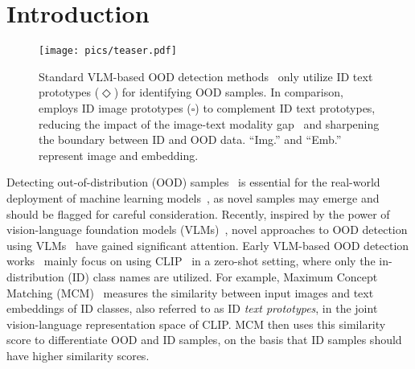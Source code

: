 \section{Introduction}
\label{sec:intro}

\begin{figure}
    \centering
    \texttt{[image: pics/teaser.pdf]}
    \vspace{-0.7em}
    \caption{
    Standard VLM-based OOD detection methods~\cite{ming2022delving,miyai_locoop_2023,li_learning_2024} only utilize ID text prototypes ($\Diamond$) for identifying OOD samples. 
    In comparison, \ours employs ID image prototypes ($\square$) to complement ID text prototypes, reducing the impact of the image-text modality gap~\cite{liang2022mind} and sharpening the boundary between ID and OOD data. 
    ``Img.'' and ``Emb.'' represent image and embedding.
    }
    \label{fig: teaser}
\end{figure}


Detecting out-of-distribution (OOD) samples~\cite{hendrycks_baseline_2017,liang_enhancing_2020,liu_energy-based_2020,huang_mos_2021,fort_exploring_2021,Wang_2022_CVPR,sun_out--distribution_2022} is essential for the real-world deployment of machine learning models~\cite{heDeepResidualLearning2016,radford_learning_2021,yang_openood_2022}, as novel samples may emerge and should be flagged for careful consideration. 
Recently, inspired by the power of vision-language foundation models (VLMs)~\cite{radford_learning_2021,girdhar_imagebind_2023,Hess_2024_WACV}, novel approaches to OOD detection using VLMs~\cite{fort_exploring_2021,esmaeilpour_zero-shot_2022,ming2022delving,adaloglou_adapting_2023,liu_category-extensible_2023,miyai_locoop_2023,park_powerfulness_2023,wang_clipn_2023,bai_id-like_2024,cao_envisioning_2024,jiang2024negative,li_learning_2024,zhang_lapt_2024} have gained significant attention. 
Early VLM-based OOD detection works~\cite{ming2022delving,wang_clipn_2023,jiang2024negative,cao_envisioning_2024} mainly focus on using CLIP~\cite{radford_learning_2021} in a zero-shot setting, where only the in-distribution (ID) class names are utilized. 
For example, Maximum Concept Matching (MCM)~\cite{ming2022delving} 
measures the similarity between input images and text embeddings of ID classes, also referred to as ID \emph{text prototypes}, in the joint vision-language representation space of CLIP.
MCM then uses this similarity score to differentiate OOD and ID samples, on the basis that ID samples should have higher similarity scores. 

